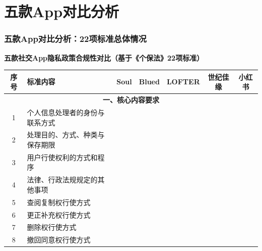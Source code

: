 \documentclass[AutoFakeBold,AutoFakeSlant]{beamer}
\newcommand{\cmark}{\textcolor{green}{\ding{51}}} %
\newcommand{\xmark}{\textcolor{red}{\ding{55}}}  %
\newcommand{\wmark}{\textcolor{orange}{\ding{72}}} %
\begin{document}
\section{五款App对比分析}
\begin{frame}
	\frametitle{五款App对比分析：22项标准总体情况}
	\scriptsize
	\textbf{五款社交App隐私政策合规性对比（基于《个保法》22项标准）}
	
	\vspace{0.5em}
	\tiny
	\begin{tabularx}{\textwidth}{|c|X|c|c|c|c|c|}
		\toprule
		\textbf{序号} & \textbf{标准内容} & \textbf{Soul} & \textbf{Blued} & \textbf{LOFTER} & \textbf{世纪佳缘} & \textbf{小红书} \\
		\midrule
		\multicolumn{7}{|c|}{\textbf{一、核心内容要求}} \\
		\midrule
		1 & 个人信息处理者的身份与联系方式 & \cmark & \cmark & \cmark & \cmark & \cmark \\
		\midrule
		2 & 处理目的、方式、种类与保存期限 & \xmark & \xmark & \xmark & \xmark & \xmark \\
		\midrule
		3 & 用户行使权利的方式和程序 & \cmark & \cmark & \cmark & \cmark & \cmark \\
		\midrule
		4 & 法律、行政法规规定的其他事项 & \cmark & \cmark & \cmark & \cmark & \cmark \\
		\midrule
		5 & 查阅复制权行使方式 & \cmark & \cmark & \cmark & \cmark & \cmark \\
		\midrule
		6 & 更正补充权行使方式 & \cmark & \cmark & \cmark & \cmark & \cmark \\
		\midrule
		7 & 删除权行使方式 & \cmark & \cmark & \cmark & \cmark & \cmark \\
		\midrule
		8 & 撤回同意权行使方式 & \cmark & \wmark & \cmark & \cmark & \cmark \\
		\bottomrule
	\end{tabularx}
\end{frame}
\end{document}
